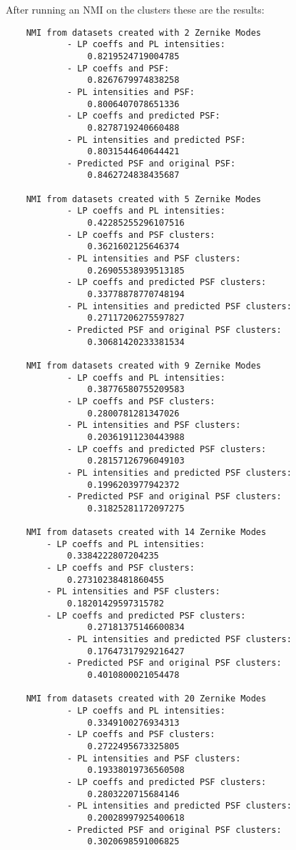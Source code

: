 		After running an NMI on the clusters these are the results:
		\begin{lstlisting}
	NMI from datasets created with 2 Zernike Modes
    		- LP coeffs and PL intensities:
    			0.8219524719004785
    		- LP coeffs and PSF: 
    			0.8267679974838258
    		- PL intensities and PSF:
    			0.8006407078651336
    		- LP coeffs and predicted PSF: 
    			0.8278719240660488
    		- PL intensities and predicted PSF: 
    			0.8031544640644421
    		- Predicted PSF and original PSF: 
    			0.8462724838435687
    				
	NMI from datasets created with 5 Zernike Modes
    		- LP coeffs and PL intensities: 
    			0.42285255296107516
    		- LP coeffs and PSF clusters: 
    			0.3621602125646374
    		- PL intensities and PSF clusters:
    			0.26905538939513185
    		- LP coeffs and predicted PSF clusters: 
    			0.33778878770748194
    		- PL intensities and predicted PSF clusters: 
    			0.27117206275597827
    		- Predicted PSF and original PSF clusters: 
    			0.30681420233381534

	NMI from datasets created with 9 Zernike Modes
    		- LP coeffs and PL intensities: 
    			0.38776580755209583
    		- LP coeffs and PSF clusters: 
    			0.2800781281347026
    		- PL intensities and PSF clusters: 
    			0.20361911230443988
    		- LP coeffs and predicted PSF clusters: 
    			0.28157126796049103
    		- PL intensities and predicted PSF clusters: 
    			0.1996203977942372
    		- Predicted PSF and original PSF clusters: 
    			0.31825281172097275

	NMI from datasets created with 14 Zernike Modes
		- LP coeffs and PL intensities: 
			0.3384222807204235
		- LP coeffs and PSF clusters: 
			0.27310238481860455
   		- PL intensities and PSF clusters: 
   			0.18201429597315782
   		- LP coeffs and predicted PSF clusters: 
    			0.27181375146600834
    		- PL intensities and predicted PSF clusters: 
    			0.17647317929216427
    		- Predicted PSF and original PSF clusters: 
    			0.4010800021054478

	NMI from datasets created with 20 Zernike Modes
    		- LP coeffs and PL intensities:
    			0.3349100276934313
    		- LP coeffs and PSF clusters: 
    			0.2722495673325805
    		- PL intensities and PSF clusters: 
    			0.19338019736560508
    		- LP coeffs and predicted PSF clusters: 
    			0.2803220715684146
    		- PL intensities and predicted PSF clusters: 
    			0.20028997925400618
    		- Predicted PSF and original PSF clusters: 
    			0.3020698591006825
	\end{lstlisting}
	
